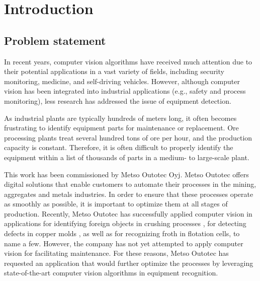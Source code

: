 \documentclass[english, 12pt, a4paper, elec, utf8, a-1b, online]{aaltothesis}
\begin{document}
\listoftodos

\cleardoublepage

\section{Introduction}

\thispagestyle{empty}
\subsection{Problem statement}
In recent years, computer vision algorithms have received much attention due to their potential applications in a vast variety of fields, including security monitoring\cite{Awalgaonkar2020}, medicine\cite{9689485}, and self-driving vehicles\cite{Janai2017}. However, although computer vision has been integrated into industrial applications (e.g., safety and process monitoring)\cite{Banf2022}\cite{Awalgaonkar2020}, less research has addressed the issue of equipment detection.

As industrial plants are typically hundreds of meters long, it often becomes frustrating to identify equipment parts for maintenance or replacement. Ore processing plants treat several hundred tons of ore per hour, and the production capacity is constant. Therefore, it is often difficult to properly identify the equipment within a list of thousands of parts in a medium- to large-scale plant.

This work has been commissioned by Metso Outotec Oyj.  Metso Outotec offers digital solutions that enable customers to automate their processes in the mining, aggregates and metals industries. In order to ensure that these processes operate as smoothly as possible, it is important to optimize them at all stages of production. Recently, Metso Outotec has successfully applied computer vision in applications for identifying foreign objects in crushing processes \cite{metso_outotec_2022}, for detecting defects in copper molds\cite{metso_outotec_2022_2} , as well as for recognizing froth in flotation cells\cite{metso_outotec_2022_1}, to name a few. However, the company has not yet attempted to apply computer vision for facilitating maintenance. For these reasons, Metso Outotec has requested an application that would further optimize the processes by leveraging state-of-the-art computer vision algorithms in equipment recognition. 
\end{document}
